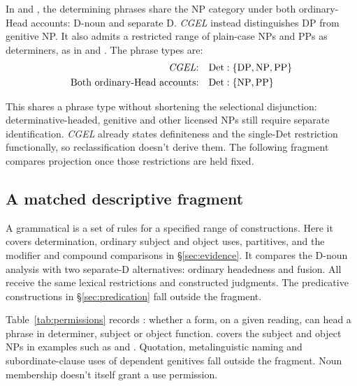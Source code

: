 \documentclass[12pt]{article}
\begin{document}
In  and , the determining phrases share the NP category under both ordinary-Head accounts: D-noun and separate D. \textit{CGEL} instead distinguishes DP from genitive NP. It also admits a restricted range of plain-case NPs and PPs as determiners, as in  and  \citep[Ch.~5, §4]{huddleston2002}. The phrase types are:
\[
\begin{aligned}
\text{\textit{CGEL}:} &\quad \mathrm{Det}:\{\mathrm{DP},\mathrm{NP},\mathrm{PP}\} \\
\text{Both ordinary-Head accounts:} &\quad \mathrm{Det}:\{\mathrm{NP},\mathrm{PP}\}
\end{aligned}
\]

This shares a phrase type without shortening the selectional disjunction: determinative-headed, genitive and other licensed NPs still require separate identification. \textit{CGEL} already states definiteness and the single-Det restriction functionally, so reclassification doesn't derive them. The following fragment compares projection once those restrictions are held fixed.

\subsection{A matched descriptive fragment}\label{sec:fragment}

A grammatical  is a set of rules for a specified range of constructions. Here it covers determination, ordinary subject and object uses, partitives, and the modifier and compound comparisons in §\ref{sec:evidence}. It compares the D-noun analysis with two separate-D alternatives: ordinary headedness and fusion. All receive the same lexical restrictions and constructed judgments. The predicative constructions in §\ref{sec:predication} fall outside the fragment.

Table~\ref{tab:permissions} records : whether a form, on a given reading, can head a phrase in determiner, subject or object function.  covers the subject and object NPs in examples such as  and . Quotation, metalinguistic naming and subordinate-clause uses of dependent genitives fall outside the fragment. Noun membership doesn't itself grant a use permission.
\end{document}
